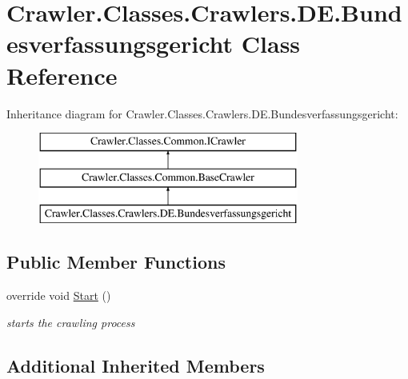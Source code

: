 \hypertarget{class_crawler_1_1_classes_1_1_crawlers_1_1_d_e_1_1_bundesverfassungsgericht}{\section{Crawler.\-Classes.\-Crawlers.\-D\-E.\-Bundesverfassungsgericht Class Reference}
\label{class_crawler_1_1_classes_1_1_crawlers_1_1_d_e_1_1_bundesverfassungsgericht}
}
Inheritance diagram for Crawler.\-Classes.\-Crawlers.\-D\-E.\-Bundesverfassungsgericht\-:\begin{figure}[H]
\begin{center}
\leavevmode
\includegraphics[height=3.000000cm]{class_crawler_1_1_classes_1_1_crawlers_1_1_d_e_1_1_bundesverfassungsgericht}
\end{center}
\end{figure}
\subsection*{Public Member Functions}
\begin{DoxyCompactItemize}
\item 
override void \hyperlink{class_crawler_1_1_classes_1_1_crawlers_1_1_d_e_1_1_bundesverfassungsgericht_a27afd53b86cc443076a2efd8df3c2078}{Start} ()
\begin{DoxyCompactList}\small\item\em starts the crawling process \end{DoxyCompactList}\end{DoxyCompactItemize}
\subsection*{Additional Inherited Members}


